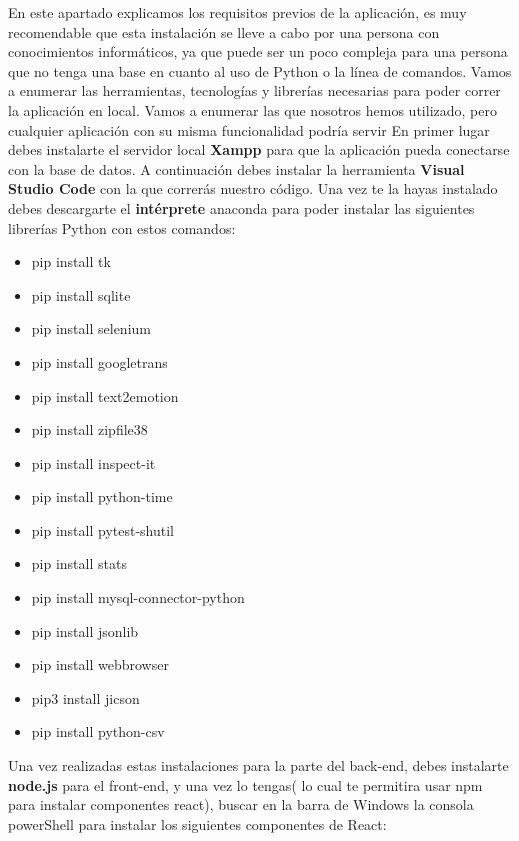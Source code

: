 En este apartado explicamos los requisitos previos de la aplicación, es muy recomendable que esta instalación se lleve a cabo por una persona con conocimientos informáticos, ya que puede ser un poco compleja para una persona que no tenga una base en cuanto al uso de Python o la línea de comandos.
Vamos a enumerar las herramientas, tecnologías y librerías necesarias para poder correr la aplicación en local. Vamos a enumerar las que nosotros hemos utilizado, pero cualquier aplicación con su misma funcionalidad podría servir En primer lugar debes instalarte el servidor local  \textbf{Xampp} para que la aplicación pueda conectarse con la base de datos. A continuación debes instalar la herramienta \textbf{Visual Studio Code} con la que correrás nuestro código. Una vez te la hayas instalado debes descargarte el \textbf{intérprete} anaconda para poder instalar las siguientes librerías Python con estos comandos:
\begin{itemize}
	\item pip install tk
	\item pip install sqlite
	\item pip install selenium
	\item pip install googletrans
	\item pip install text2emotion
	\item pip install zipfile38
	\item pip install inspect-it
	\item pip install python-time
	\item pip install pytest-shutil
	\item pip install stats
	\item pip install mysql-connector-python
	\item pip install jsonlib
	\item pip install webbrowser
	\item pip3 install jicson
	\item pip install python-csv
\end{itemize}
Una vez realizadas estas instalaciones para la parte del back-end, debes instalarte \textbf{node.js} para el front-end, y una vez lo tengas( lo cual te permitira usar npm para instalar componentes react), buscar en la barra de Windows la consola powerShell para instalar los siguientes componentes de React:
